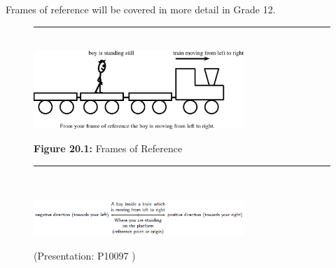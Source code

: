 Frames of reference will be covered in more detail in Grade 12.\par 
    \setcounter{subfigure}{0}
	\begin{figure}[H] %
    \begin{center}
    \rule[.1in]{\figurerulewidth}{.005in} \\
        \label{m38787*uid5!!!underscore!!!media}\label{m38787*uid5!!!underscore!!!printimage}\includegraphics[width=300px]{col11305.imgs/m38787_PG10C2_001.png} %
      \vspace{2pt}
    \vspace{\rubberspace}\par \begin{cnxcaption}
	  \small \textbf{Figure 20.1: }Frames of Reference
	\end{cnxcaption}
    \vspace{.1in}
    \rule[.1in]{\figurerulewidth}{.005in} \\
    \end{center}
 \end{figure}       
        \label{m38787*id62702}
    \setcounter{subfigure}{0}
	\begin{figure}[H] %
    \begin{center}
    \label{m38787*id62705!!!underscore!!!media}\label{m38787*id62705!!!underscore!!!printimage}\includegraphics[width=300px]{col11305.imgs/m38787_PG10C2_002.png} %
      \vspace{2pt}
    \vspace{.1in}
    \end{center}
 \end{figure}       
         \label{m38787*eip-509}
    \setcounter{subfigure}{0}
	\begin{figure}[H] %
    \label{m38787*slidesharemedia}\label{m38787*slideshareflash} { (Presentation:  P10097 )}
      \vspace{2pt}
    \vspace{.1in}
 \end{figure}       \par 
      \label{m38787*uid6}
